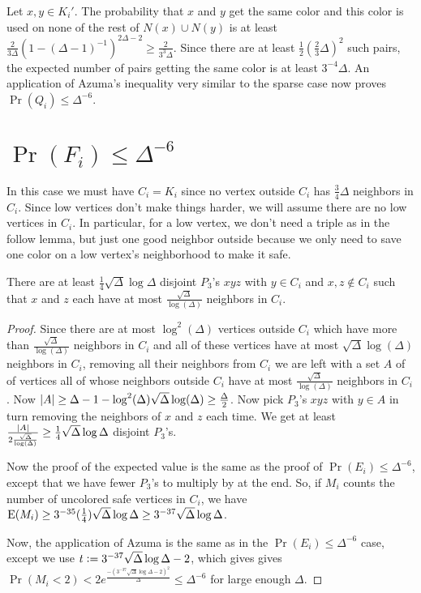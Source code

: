 Let $x, y \in K_i'$.  The probability that $x$ and $y$ get the same color and
this color is used on none of the rest of $N(x) \cup N(y)$ is at least
$\frac{2}{3\Delta}(1 - (\Delta-1)^{-1})^{2\Delta - 2} \geq \frac{2}{3^3\Delta}$.
Since there are at least $\frac12 (\frac23 \Delta)^2$ such pairs, the expected
number of pairs getting the same color is at least $3^{-4}\Delta$.  An
application of Azuma's inequality very similar to the sparse case now proves
$\Pr(Q_i) \leq \Delta^{-6}$.

\section{\texorpdfstring{$\Pr(F_i) \leq \Delta^{-6}$}{The F events}}
In this case we must have $C_i = K_i$ since no vertex outside $C_i$ has
$\frac34 \Delta$ neighbors in $C_i$.  Since low vertices don't make things
harder, we will assume there are no low vertices in $C_i$.  In particular, for a
low vertex, we don't need a triple as in the follow lemma, but just one good neighbor outside because we only need to save one color on a low
vertex's neighborhood to make it safe.

\begin{lem}\label{triplesAgain}
There are at least $\frac14 \sqrt{\Delta}\log{\Delta}$ disjoint $P_3$'s $xyz$
with $y \in C_i$ and $x, z \not \in C_i$ such that $x$ and $z$ each have at most
$\frac{\sqrt{\Delta}}{\log(\Delta)}$ neighbors in $C_i$.
\end{lem}
\begin{proof}
Since there are at most $\log^2(\Delta)$ vertices outside $C_i$ which have more
than $\frac{\sqrt{\Delta}}{\log(\Delta)}$ neighbors in $C_i$ and all of these
vertices have at most $\sqrt{\Delta}\log(\Delta)$ neighbors in $C_i$, removing
all their neighbors from $C_i$ we are left with a set $A$ of of vertices all of
whose neighbors outside $C_i$ have at most $\frac{\sqrt{\Delta}}{\log(\Delta)}$
neighbors in $C_i$.  Now $\left|A\right| \geq \Delta - 1 -
\log^2(\Delta)\sqrt{\Delta}\log(\Delta) \geq \frac{\Delta}{2}$.  Now pick
$P_3$'s $xyz$ with $y \in A$ in turn removing the neighbors of $x$ and $z$ each
time.  We get at least $\frac{\left|A\right|}{2\frac{\sqrt{\Delta}}{\log(\Delta)}}
\geq \frac14 \sqrt{\Delta}\log{\Delta}$ disjoint $P_3$'s.

Now the proof of the expected value is the same as the proof of $\Pr(E_i) \leq
\Delta^{-6}$, except that we have fewer $P_3$'s to multiply by at the end.  So,
if $M_i$ counts the number of uncolored safe vertices in $C_i$, we have
$\operatorname{E}(M_i) \geq 3^{-35} (\frac14) \sqrt{\Delta}\log{\Delta} \geq 3^{-37}
\sqrt{\Delta}\log{\Delta}$.

Now, the application of Azuma is the same as in the $\Pr(E_i) \leq
\Delta^{-6}$ case, except we use $t \mathrel{\mathop:}= 3^{-37}
\sqrt{\Delta}\log{\Delta} - 2$, which gives gives $\Pr(M_i < 2) <
2e^{\frac{-(3^{-37} \sqrt{\Delta}\log{\Delta} - 2)^2}{\Delta}} \leq
\Delta^{-6}$ for large enough $\Delta$.
\end{proof}

